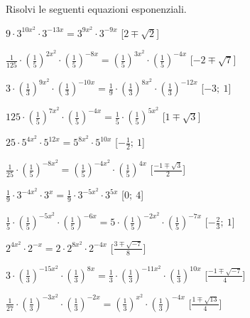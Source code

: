 \begin{esercizio}\label{ese:}
 Risolvi le seguenti equazioni esponenziali.
 \begin{enumeratea}
  \item  \(9 \cdot 3^{{10x^2}} \cdot 3^{{-13x}} = 3^{{9x^2}} \cdot 3^{{-9x}}\)
   \hfill [\(2 \mp \sqrt{2}\)]
  \item  \(\frac{1}{125} \cdot \left(\frac{1}{5}\right)^{{2x^2}} \cdot 
\left(\frac{1}{5}\right)^{{-8x}} = \left(\frac{1}{5}\right)^{{3x^2}} \cdot 
\left(\frac{1}{5}\right)^{{-4x}}\)
   \hfill [\(-2 \mp \sqrt{7}\)]
  \item  \(3 \cdot \left(\frac{1}{3}\right)^{{9x^2}} \cdot 
\left(\frac{1}{3}\right)^{{-10x}} = \frac{1}{9} \cdot 
\left(\frac{1}{3}\right)^{{8x^2}} \cdot \left(\frac{1}{3}\right)^{{-12x}}\)
   \hfill [\(-3;~1\)]
  \item  \(125 \cdot \left(\frac{1}{5}\right)^{{7x^2}} \cdot 
\left(\frac{1}{5}\right)^{{-4x}} = \frac{1}{5} \cdot 
\left(\frac{1}{5}\right)^{{5x^2}}\)
   \hfill [\(1 \mp \sqrt{3}\)]
  \item  \(25 \cdot 5^{{4x^2}} \cdot 5^{{12x}} = 5^{{8x^2}} \cdot 5^{{10x}}\)
   \hfill [\(-\frac{1}{2};~1\)]
  \item  \(\frac{1}{25} \cdot \left(\frac{1}{5}\right)^{{-8x^2}} = 
\left(\frac{1}{5}\right)^{{-4x^2}} \cdot \left(\frac{1}{5}\right)^{{4x}}\)
   \hfill [\(\frac{-1 \mp \sqrt{3}} 2\)]
  \item  \(\frac{1}{9} \cdot 3^{{-4x^2}} \cdot 3^{{x}} = \frac{1}{9} \cdot 
3^{{-5x^2}} \cdot 3^{{5x}}\)
   \hfill [\(0;~4\)]
  \item  \(\frac{1}{5} \cdot \left(\frac{1}{5}\right)^{{-5x^2}} \cdot 
\left(\frac{1}{5}\right)^{{-6x}} = 5 \cdot \left(\frac{1}{5}\right)^{{-2x^2}} 
\cdot \left(\frac{1}{5}\right)^{{-7x}}\)
   \hfill [\(-\frac{2}{3};~1\)]
  \item  \(2^{{4x^2}} \cdot 2^{{-x}} = 2 \cdot 2^{{8x^2}} \cdot 2^{{-4x}}\)
   \hfill [\(\frac{3 \mp \sqrt{-7}} 8\)]
  \item  \(3 \cdot \left(\frac{1}{3}\right)^{{-15x^2}} \cdot 
\left(\frac{1}{3}\right)^{{8x}} = \frac{1}{3} \cdot 
\left(\frac{1}{3}\right)^{{-11x^2}} \cdot \left(\frac{1}{3}\right)^{{10x}}\)
   \hfill [\(\frac{-1 \mp \sqrt{-7}} 4\)]
  \item  \(\frac{1}{27} \cdot \left(\frac{1}{3}\right)^{{-3x^2}} \cdot 
\left(\frac{1}{3}\right)^{{-2x}} = \left(\frac{1}{3}\right)^{{x^2}} \cdot 
\left(\frac{1}{3}\right)^{{-4x}}\)
   \hfill [\(\frac{1 \mp \sqrt{13}} 4\)]
 
 \end{enumeratea}
\end{esercizio}


